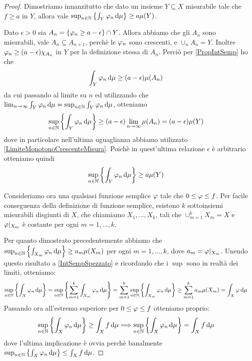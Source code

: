 \begin{proof}
	Dimostriamo innanzitutto che dato un insieme $Y\subseteq X$ misurabile tale che $f\ge a$ in $Y$, allora vale $\sup_{n\in\mathbb N}\left\{\int_Y\varphi_n\,\mathrm d\mu\right\}\ge a\mu(Y)$.
	
	Dato $\epsilon>0$ sia $A_n=\{\varphi_n\ge a-\epsilon\}\cap Y$. Allora abbiamo che gli $A_n$ sono misurabili, vale $A_n\subseteq A_{n+1}$, perchè le $\varphi_n$ sono crescenti, e $\cup_nA_n=Y$. Inoltre $\varphi_n\ge (a-\epsilon)\chi_{A_n}$ in $Y$ per la definizione stessa di $A_n$. Perciò per \cref{PropIntSemp} ho che
	\begin{equation*}
		\int_Y\varphi_n\,\mathrm d\mu\ge(a-\epsilon)\mu(A_n)
	\end{equation*}
	da cui passando al limite su $n$ ed utilizzando che $\lim_{n\to\infty}\int_Y\varphi_n\,\mathrm d\mu=\sup_{n\in\mathbb N}\int_Y\varphi_n\,\mathrm d\mu$, otteniamo
	\begin{equation*}
		\sup_{n\in\mathbb N}\left\{\int_Y\varphi_n\,\mathrm d\mu\right\}\ge(a-\epsilon)\lim_{n\to\infty}\mu(A_n)=(a-\epsilon)\mu(Y)
	\end{equation*}
	dove in particolare nell'ultima uguaglianza abbiamo utilizzato \cref{LimiteMonotonoCrescenteMisura}. Poichè in quest'ultima relazione $\epsilon$ è arbitrario otteniamo quindi
	\begin{equation*}
		\sup_{n\in\mathbb N}\left\{\int_Y\varphi_n\,\mathrm d\mu\right\}\ge a\mu(Y)
	\end{equation*}

	Consideriamo ora una qualsiasi funzione semplice $\varphi$ tale che $0\le \varphi\le f$. Per facile conseguenza della definizione di funzione semplice, esistono $k$ sottoinsiemi misurabili disgiunti di $X$, che chiamiamo $X_1,\dots,X_k$, tali che $\cup_{m=1}^kX_m=X$ e $\varphi|_{X_m}$ è costante per ogni $m=1,\dots,k$.
	
	Per quanto dimostrato precedentemente abbiamo che $\sup_{n\in\mathbb N}\left\{\int_{X_m}\varphi_n\,\mathrm d\mu\right\}\ge a_m\mu(X_m)$ per ogni $m=1,\dots,k$, dove $a_m=\varphi|_{X_m}$. Unendo questo risultato a \cref{IntSempSpezzato} e ricordando che i $\sup$ sono in realtà dei limiti, otteniamo:
	\begin{equation*}
		\sup_{n\in\mathbb N}\left\{\int_X\varphi_n\,\mathrm d\mu\right\}=\sup_{n\in\mathbb N}\left\{\sum_{m=1}^k \int_{X_m}\varphi_n\,\mathrm d \mu\right\}=\sum_{m=1}^k\sup_{n\in\mathbb N}\left\{ \int_{X_m}\varphi_n\,\mathrm d \mu\right\}\ge \sum_{m=1}^ka_m\mu(X_m)=\int_X\varphi\,\mathrm d\mu
	\end{equation*}
	Passando ora all'estremo superiore per $0\le \varphi \le f$ otteniamo proprio:
	\begin{equation*}
		\sup_{n\in\mathbb N}\left\{\int_X\varphi_n\,\mathrm d\mu\right\}\ge \int_X f \,\mathrm d\mu\Longrightarrow \sup_{n\in\mathbb N}\left\{\int_X\varphi_n\,\mathrm d\mu\right\}= \int_X f\,\mathrm d\mu
	\end{equation*}
	dove l'ultima implicazione è ovvia perchè banalmente $\sup_{n\in\mathbb N}\left\{\int_X\varphi_n\,\mathrm d\mu\right\}\le \int_X f\,\mathrm d\mu$.
\end{proof}

